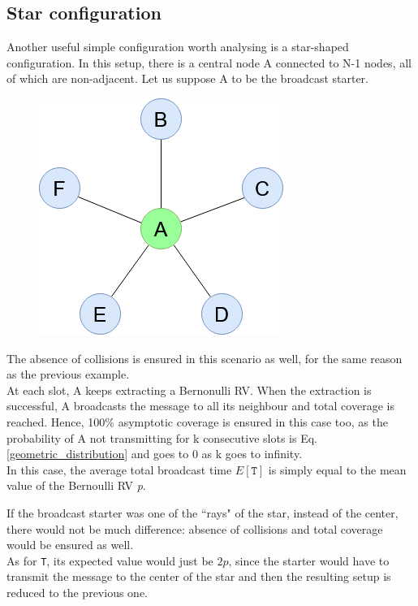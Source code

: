 \subsection{Star configuration}
Another useful simple configuration worth analysing is a star-shaped configuration. In this setup, there is a central node A connected to N-1 nodes, all of which are non-adjacent. Let us suppose A to be the broadcast starter.

\begin{figure}[H]%
    \centering
	{{\includegraphics[scale=0.5]{img/star_graph.png} }}%
    \caption{}%
    \label{fig:star_graph}%
\end{figure}

The absence of collisions is ensured in this scenario as well, for the same reason as the previous example.\\
At each slot, A keeps extracting a Bernonulli RV. When the extraction is successful, A broadcasts the message to all its neighbour and total coverage is reached. Hence, 100\% asymptotic coverage is ensured in this case too, as the probability of A not transmitting for k consecutive slots is Eq. \ref{geometric_distribution} and goes to 0 as k goes to infinity.\\
In this case, the average total broadcast time $E[\texttt{T}]$ is simply equal to the mean value of the Bernoulli RV \textit{p}.

If the broadcast starter was one of the ``rays" of the star, instead of the center, there would not be much difference: absence of collisions and total coverage would be ensured as well.\\
As for \texttt{T}, its expected value would just be $2p$, since the starter would have to transmit the message to the center of the star and then the resulting setup is reduced to the previous one.